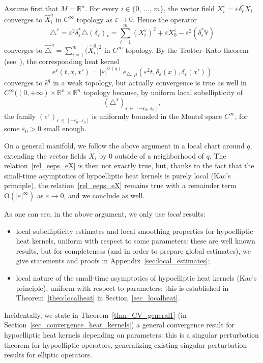 \documentclass[AHL,Unicode,published]{cedram}
\newcommand*\R{\mathbb{R}}
\newcommand{\bbV}{\mathbb{V}}
\newcommand{\calQ}{\mathcal{Q}}
\newcommand{\rmO}{\mathrm{O}}
\begin{document}
Assume first that $M=\R^n$. For every $i\in\{0,\,\ldots,\,m\}$, the vector field $X_i^\varepsilon = \varepsilon\delta_\varepsilon^*X_i$ converges to $\widehat{X}^q_i$ in $C^\infty$ topology as $\varepsilon\rightarrow 0$. Hence the operator
\[
\triangle^\varepsilon = \varepsilon^2\delta_\varepsilon^*\triangle(\delta_\varepsilon)_* = \sum_{i=1}^m \left(X^\varepsilon_i \right)^2 + \varepsilon X^\varepsilon_0 - \varepsilon^2 \left(\delta_\varepsilon^*\bbV\right)
\]
converges to $\widehat{\triangle}^{q} = \sum_{i=1}^m \big(\widehat{X}^q_i\big)^2$ in $C^\infty$ topology. By the Trotter--Kato theorem (see~\cite{EngelNagel,Pazy}), the corresponding heat kernel
\begin{equation}\label{rel_eeps_eX}
e^\varepsilon (t,x,x') = \vert\varepsilon\vert^{\calQ(q)}\, e_{\triangle,\,\mu}\left(\varepsilon^2 t,\delta_\varepsilon(x),\delta_\varepsilon(x')\right)
\end{equation}
converges to $\widehat{e}^{q}$ in a weak topology, but actually convergence is true as well in $C^\infty((0,+\infty)\times\R^n\times\R^n$ topology because, by uniform local subellipticity of \[
(\triangle^\varepsilon)_{\varepsilon\,\in\,[-\varepsilon_0,\,\varepsilon_0]},
\]
the family $(e^\varepsilon)_{\varepsilon\,\in\,[-\varepsilon_0,\,\varepsilon_0]}$ is uniformly bounded in the Montel space $C^\infty$, for some $\varepsilon_0>0$ small enough.

On a general manifold, we follow the above argument in a local chart around $q$, extending the vector fields $X_i$ by $0$ outside of a neighborhood of $q$. The relation~\eqref{rel_eeps_eX} is then not exactly true, but, thanks to the fact that the small-time asymptotics of hypoelliptic heat kernels is purely local (Kac's principle), the relation~\eqref{rel_eeps_eX} remains true with a remainder term $\rmO(\vert\varepsilon\vert^\infty)$ as $\varepsilon\rightarrow 0$, and we conclude as well.


As one can see, in the above argument, we only use \emph{local} results:
\begin{itemize}
\item local subellipticity estimates and local smoothing properties for hypoelliptic heat kernels, uniform with respect to some parameters: these are well known results, but for completeness (and in order to prepare global estimates), we give statements and proofs in Appendix~\ref{sec:local_estimates};
\item local nature of the small-time asymptotics of hypoelliptic heat kernels (Kac's principle), uniform with respect to parameters: this is established in Theorem~\ref{theo:localheat} in Section~\ref{sec_localheat}.
\end{itemize}
Incidentally, we state in Theorem~\ref{thm_CV_general1} (in Section~\ref{sec_convergence_heat_kernels}) a general convergence result for hypoelliptic heat kernels depending on parameters: this is a singular perturbation theorem for hypoelliptic operators, generalizing existing singular perturbation results for elliptic operators.
\end{document}
